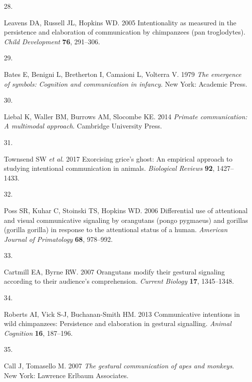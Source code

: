 \documentclass[
  man,floatsintext]{apa6}
\newlength{\cslhangindent}
\newlength{\csllabelwidth}
\newlength{\cslentryspacingunit} %
\newenvironment{CSLReferences}[2] %
 {%
  \setlength{\parindent}{0pt}
  \ifodd #1
  \let\oldpar\par
  \def\par{\hangindent=\cslhangindent\oldpar}
  \fi
  \setlength{\parskip}{#2\cslentryspacingunit}
 }%
 {}
\newcommand{\CSLLeftMargin}[1]{\parbox[t]{\csllabelwidth}{#1}}
\newcommand{\CSLRightInline}[1]{\parbox[t]{\linewidth - \csllabelwidth}{#1}\break}
\begin{document}
\begin{CSLReferences}{0}{0}
\leavevmode{}%
\CSLLeftMargin{28. }
\CSLRightInline{Leavens DA, Russell JL, Hopkins WD. 2005 Intentionality as measured in the persistence and elaboration of communication by chimpanzees (pan troglodytes). \emph{Child Development} \textbf{76}, 291--306.}

\leavevmode{}%
\CSLLeftMargin{29. }
\CSLRightInline{Bates E, Benigni L, Bretherton I, Camaioni L, Volterra V. 1979 \emph{The emergence of symbols: Cognition and communication in infancy}. New York: Academic Press. }

\leavevmode{}%
\CSLLeftMargin{30. }
\CSLRightInline{Liebal K, Waller BM, Burrows AM, Slocombe KE. 2014 \emph{Primate communication: A multimodal approach}. Cambridge University Press. }

\leavevmode{}%
\CSLLeftMargin{31. }
\CSLRightInline{Townsend SW \emph{et al.} 2017 Exorcising grice's ghost: An empirical approach to studying intentional communication in animals. \emph{Biological Reviews} \textbf{92}, 1427--1433.}

\leavevmode{}%
\CSLLeftMargin{32. }
\CSLRightInline{Poss SR, Kuhar C, Stoinski TS, Hopkins WD. 2006 Differential use of attentional and visual communicative signaling by orangutans (pongo pygmaeus) and gorillas (gorilla gorilla) in response to the attentional status of a human. \emph{American Journal of Primatology} \textbf{68}, 978--992.}

\leavevmode{}%
\CSLLeftMargin{33. }
\CSLRightInline{Cartmill EA, Byrne RW. 2007 Orangutans modify their gestural signaling according to their audience's comprehension. \emph{Current Biology} \textbf{17}, 1345--1348.}

\leavevmode{}%
\CSLLeftMargin{34. }
\CSLRightInline{Roberts AI, Vick S-J, Buchanan-Smith HM. 2013 Communicative intentions in wild chimpanzees: Persistence and elaboration in gestural signalling. \emph{Animal Cognition} \textbf{16}, 187--196.}

\leavevmode{}%
\CSLLeftMargin{35. }
\CSLRightInline{Call J, Tomasello M. 2007 \emph{The gestural communication of apes and monkeys}. New York: Lawrence Erlbaum Associates. }


\end{CSLReferences}
\end{document}
